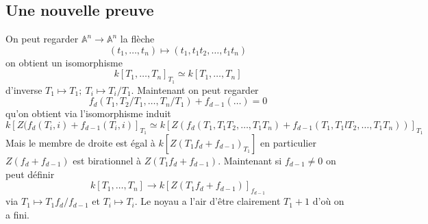 \documentclass[a4paper,12pt]{book}
\newcommand{\A}{\mathbb{A}}
\theoremstyle{plain}
\theoremstyle{definition}
\theoremstyle{remark}
\begin{document}
\subsection{Une nouvelle preuve}
On peut regarder $\A^n\to \A^n$ la flèche 
\[(t_1,\ldots,t_n)\mapsto (t_1, t_1t_2,\ldots, t_1t_n)\]
on obtient un isomorphisme 
\[k[T_1,\ldots, T_n]_{T_1}\simeq k[T_1,\ldots, T_n]\]
d'inverse $T_1\mapsto T_1;~T_i\mapsto T_i/T_1$. Maintenant on peut 
regarder \[f_d(T_1, T_2/T_1, \ldots, T_n/T_1)+f_{d-1}(\ldots)=0\] qu'on
obtient via l'isomorphisme induit 
\[k[Z(f_d(T_i,i)+f_{d-1}(T_i,i)]_{T_1}\simeq k[Z(f_d(T_1,T_1T_2,\ldots,T_1T_n)+f_{d-1}(T_1,T_1lT_2,\ldots, T_1T_n))]_{T_1}\]
Mais le membre de droite est égal à $k[Z(T_1f_d+f_{d-1})_{T_1}]$ en
particulier $Z(f_d+f_{d-1})$ est birationnel à $Z(T_1f_d+f_{d-1})$.
Maintenant si $f_{d-1}\ne 0$ on peut définir
\[k[T_1,\ldots, T_n]\to k[Z(T_1f_d+f_{d-1})]_{f_{d-1}}\]
via $T_1\mapsto T_1f_d/f_{d-1}$ et $T_i\mapsto T_i$. Le noyau a l'air 
d'être clairement $T_1+1$ d'où on a fini.




\printbibliography
\end{document}
